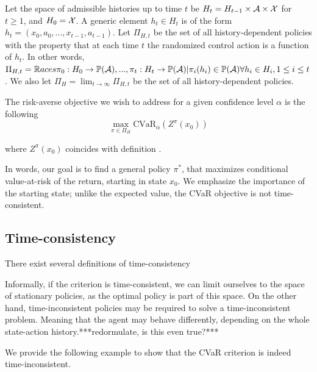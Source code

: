 \begin{definition}
Let the space of admissible histories up to time $t$ be $H_t = H_{t-1} \times \mathcal{A} \times \mathcal{X}$ for $t \ge 1$, and $H_0 = \mathcal{X}$. A generic element $h_t \in H_t$ is of the form $h_t = (x_0, a_0, ..., x_{t-1}, a_{t-1})$. Let $\Pi_{H,t}$ be the set of all history-dependent policies with the property that at each time $t$ the randomized control action is a function of $h_t$. In other words, 
$\Pi_{H,t} = \mathbb{R}aces{\pi_0: H_0 \to \mathbb{P}(\mathcal{A}), ..., \pi_t: H_t \to \mathbb{P}(\mathcal{A})|\pi_i(h_i) \in \mathbb{P}(\mathcal{A}) \forall h_i \in H_i, 1\le i\le t}$. We also let $\Pi_H = \lim_{t\to\infty}\Pi_{H,t}$ be the set of all history-dependent policies.
\end{definition}

The risk-averse objective we wish to address for a given confidence level $\alpha$ is the following
\begin{equation}\label{eqn:prelim:problem}
\max_{\pi \in \Pi_H} \text{CVaR}_\alpha(Z^\pi(x_0))
\end{equation}

where $Z^\pi(x_0)$ coincides with definition .

In words, our goal is to find a general policy $\pi^*$, that maximizes conditional value-at-risk of the return, starting in state $x_0$. We emphasize the importance of the starting state; unlike the expected value, the CVaR objective is not time-consistent.


\subsection{Time-consistency}

There exist several definitions of time-consistency \cite{many}

Informally, if the criterion is time-consistent, we can limit ourselves to the space of stationary policies, as the optimal policy is part of this space. On the other hand, time-inconsistent policies may be required to solve a time-inconsistent problem. Meaning that the agent may behave differently, depending on the whole state-action history.***redormulate, is this even true?***

We provide the following example to show that the CVaR criterion is indeed time-inconsistent.




